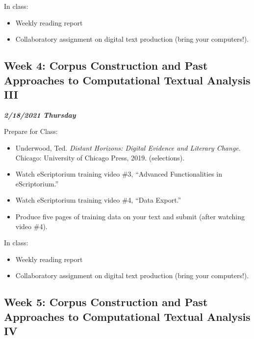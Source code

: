 \documentclass[
]{book}
\providecommand{\tightlist}{%
  \setlength{\itemsep}{0pt}\setlength{\parskip}{0pt}}
\begin{document}
In class:

\begin{itemize}
\tightlist
\item
  Weekly reading report
\item
  Collaboratory assignment on digital text production (bring your computers!).
\end{itemize}

\hypertarget{week-4-corpus-construction-and-past-approaches-to-computational-textual-analysis-iii}{%
\subsection{Week 4: Corpus Construction and Past Approaches to Computational Textual Analysis III}\label{week-4-corpus-construction-and-past-approaches-to-computational-textual-analysis-iii}}

\textbf{\emph{2/18/2021 Thursday}}

Prepare for Class:

\begin{itemize}
\tightlist
\item
  Underwood, Ted. \emph{Distant Horizons: Digital Evidence and Literary Change}. Chicago: University of Chicago Press, 2019. (selections).
\item
  Watch eScriptorium training video \#3, ``Advanced Functionalities in eScriptorium.''
\item
  Watch eScriptorium training video \#4, ``Data Export.''
\item
  Produce five pages of training data on your text and submit (after watching video \#4).
\end{itemize}

In class:

\begin{itemize}
\tightlist
\item
  Weekly reading report
\item
  Collaboratory assignment on digital text production (bring your computers!).
\end{itemize}

\hypertarget{week-5-corpus-construction-and-past-approaches-to-computational-textual-analysis-iv}{%
\subsection{Week 5: Corpus Construction and Past Approaches to Computational Textual Analysis IV}\label{week-5-corpus-construction-and-past-approaches-to-computational-textual-analysis-iv}}
\end{document}
